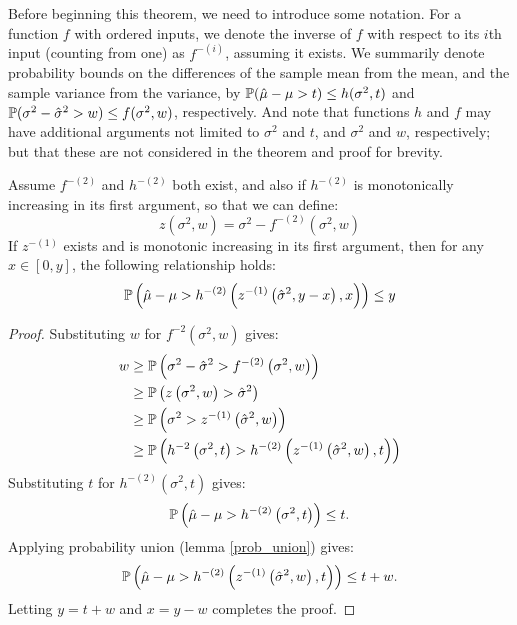 Before beginning this theorem, we need to introduce some notation.
For a function $f$ with ordered inputs, we denote the inverse of $f$ with respect to its $i${th} input (counting from one) as $f^{-(i)}$, assuming it exists.
We summarily denote probability bounds on the differences of the sample mean from the mean, and the sample variance from the variance, by
$\operatorname{\mathbb{P}}(\hat{\mu}-\mu>t)\le h(\sigma^2,t)$ and $\operatorname{\mathbb{P}}(\sigma^2-\hat{\sigma}^2>w)\le f(\sigma^2,w)$, respectively.
And note that functions $h$ and $f$ may have additional arguments not limited to $\sigma^2$ and $t$, and $\sigma^2$ and $w$, respectively; but that these are not considered in the theorem and proof for brevity.

\begin{theorem}\label{ebb1} 
Assume $f^{-(2)}$ and $h^{-(2)}$ both exist, and also if $h^{-(2)}$ is monotonically increasing in its first argument, so that we can define:
\[
z(\sigma^2,w) = \sigma^2-f^{-(2)}\left(\sigma^2,w\right)
\]
If $z^{-(1)}$ exists and is monotonic increasing in its first argument, then for any $x\in[0,y]$, the following relationship holds:
\[
\operatorname{\mathbb{P}}\left(\hat{\mu}-\mu>h^{-(2)}\left(z^{-(1)}\left(\hat{\sigma}^2,y-x\right),x\right)\right)
\le y
\]
\end{theorem}
%
\begin{proof}
Substituting $w$ for $f^{-2}(\sigma^2,w)$ gives:
\begin{align*}
w & \ge \operatorname{\mathbb{P}}\left(\sigma^2-\hat{\sigma}^2>f^{-(2)}\left(\sigma^2,w\right)\right)\\
 & \ge \operatorname{\mathbb{P}}\left(z\left(\sigma^2,w\right)>\hat{\sigma}^2\right)\\
 & \ge \operatorname{\mathbb{P}}\left(\sigma^2>z^{-(1)}\left(\hat{\sigma}^2,w\right)\right)\\
 & \ge \operatorname{\mathbb{P}}\left(h^{-2}\left(\sigma^2,t\right)>h^{-(2)}\left(z^{-(1)}\left(\hat{\sigma}^2,w\right),t\right)\right)
\end{align*}
Substituting $t$ for $h^{-(2)}(\sigma^2,t)$ gives:
\[
\operatorname{\mathbb{P}}\left(\hat{\mu}-\mu>h^{-(2)}\left(\sigma^2,t\right)\right)
\le t.
\]
Applying probability union (lemma \ref{prob_union}) gives:\\
\[
\operatorname{\mathbb{P}}\left(\hat{\mu}-\mu>h^{-(2)}\left(z^{-(1)}\left(\hat{\sigma}^2,w\right),t\right)\right)
\le t+w.
\]
Letting $y=t+w$ and $x=y-w$ completes the proof.
\end{proof}

